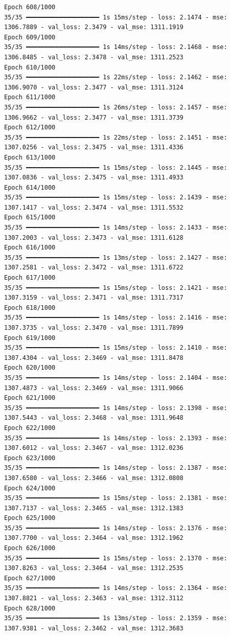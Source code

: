 \documentclass[
  letterpaper,
  DIV=11,
  numbers=noendperiod]{scrreprt}
\begin{document}
\begin{verbatim}
Epoch 608/1000
35/35 ━━━━━━━━━━━━━━━━━━━━ 1s 15ms/step - loss: 2.1474 - mse: 1306.7889 - val_loss: 2.3479 - val_mse: 1311.1919
Epoch 609/1000
35/35 ━━━━━━━━━━━━━━━━━━━━ 1s 14ms/step - loss: 2.1468 - mse: 1306.8485 - val_loss: 2.3478 - val_mse: 1311.2523
Epoch 610/1000
35/35 ━━━━━━━━━━━━━━━━━━━━ 1s 22ms/step - loss: 2.1462 - mse: 1306.9070 - val_loss: 2.3477 - val_mse: 1311.3124
Epoch 611/1000
35/35 ━━━━━━━━━━━━━━━━━━━━ 1s 26ms/step - loss: 2.1457 - mse: 1306.9662 - val_loss: 2.3477 - val_mse: 1311.3739
Epoch 612/1000
35/35 ━━━━━━━━━━━━━━━━━━━━ 1s 22ms/step - loss: 2.1451 - mse: 1307.0256 - val_loss: 2.3475 - val_mse: 1311.4336
Epoch 613/1000
35/35 ━━━━━━━━━━━━━━━━━━━━ 1s 15ms/step - loss: 2.1445 - mse: 1307.0836 - val_loss: 2.3475 - val_mse: 1311.4933
Epoch 614/1000
35/35 ━━━━━━━━━━━━━━━━━━━━ 1s 15ms/step - loss: 2.1439 - mse: 1307.1417 - val_loss: 2.3474 - val_mse: 1311.5532
Epoch 615/1000
35/35 ━━━━━━━━━━━━━━━━━━━━ 1s 14ms/step - loss: 2.1433 - mse: 1307.2003 - val_loss: 2.3473 - val_mse: 1311.6128
Epoch 616/1000
35/35 ━━━━━━━━━━━━━━━━━━━━ 1s 13ms/step - loss: 2.1427 - mse: 1307.2581 - val_loss: 2.3472 - val_mse: 1311.6722
Epoch 617/1000
35/35 ━━━━━━━━━━━━━━━━━━━━ 1s 15ms/step - loss: 2.1421 - mse: 1307.3159 - val_loss: 2.3471 - val_mse: 1311.7317
Epoch 618/1000
35/35 ━━━━━━━━━━━━━━━━━━━━ 1s 14ms/step - loss: 2.1416 - mse: 1307.3735 - val_loss: 2.3470 - val_mse: 1311.7899
Epoch 619/1000
35/35 ━━━━━━━━━━━━━━━━━━━━ 1s 15ms/step - loss: 2.1410 - mse: 1307.4304 - val_loss: 2.3469 - val_mse: 1311.8478
Epoch 620/1000
35/35 ━━━━━━━━━━━━━━━━━━━━ 1s 14ms/step - loss: 2.1404 - mse: 1307.4873 - val_loss: 2.3469 - val_mse: 1311.9066
Epoch 621/1000
35/35 ━━━━━━━━━━━━━━━━━━━━ 1s 14ms/step - loss: 2.1398 - mse: 1307.5443 - val_loss: 2.3468 - val_mse: 1311.9648
Epoch 622/1000
35/35 ━━━━━━━━━━━━━━━━━━━━ 1s 14ms/step - loss: 2.1393 - mse: 1307.6012 - val_loss: 2.3467 - val_mse: 1312.0236
Epoch 623/1000
35/35 ━━━━━━━━━━━━━━━━━━━━ 1s 14ms/step - loss: 2.1387 - mse: 1307.6580 - val_loss: 2.3466 - val_mse: 1312.0808
Epoch 624/1000
35/35 ━━━━━━━━━━━━━━━━━━━━ 1s 15ms/step - loss: 2.1381 - mse: 1307.7137 - val_loss: 2.3465 - val_mse: 1312.1383
Epoch 625/1000
35/35 ━━━━━━━━━━━━━━━━━━━━ 1s 14ms/step - loss: 2.1376 - mse: 1307.7700 - val_loss: 2.3464 - val_mse: 1312.1962
Epoch 626/1000
35/35 ━━━━━━━━━━━━━━━━━━━━ 1s 15ms/step - loss: 2.1370 - mse: 1307.8263 - val_loss: 2.3464 - val_mse: 1312.2535
Epoch 627/1000
35/35 ━━━━━━━━━━━━━━━━━━━━ 1s 14ms/step - loss: 2.1364 - mse: 1307.8821 - val_loss: 2.3463 - val_mse: 1312.3112
Epoch 628/1000
35/35 ━━━━━━━━━━━━━━━━━━━━ 1s 13ms/step - loss: 2.1359 - mse: 1307.9381 - val_loss: 2.3462 - val_mse: 1312.3683

\end{verbatim}
\end{document}
